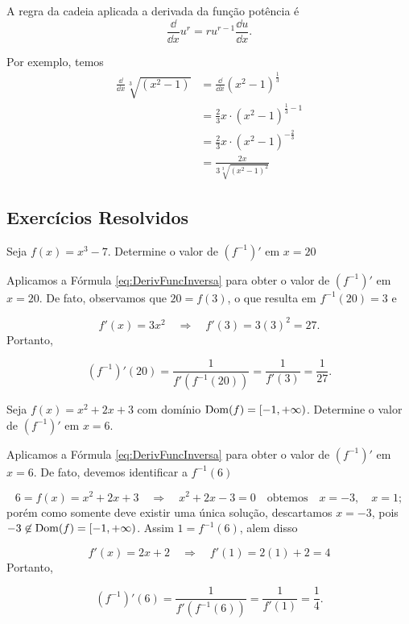 \cleardoublepage\documentclass[../main.tex]{subfiles}
\begin{document}
\begin{ex}
  A regra da cadeia aplicada a derivada da função potência é
  \begin{equation*}
    \frac{\dd}{\dd x}u^r = ru^{r-1}\frac{\dd u}{\dd x}.
  \end{equation*}
  
  Por exemplo, temos
  \begin{align*}
    \frac{\dd}{\dd x}\sqrt[3]{(x^2-1)} &= \frac{\dd}{\dd x}(x^2-1)^{\frac{1}{3}} \\
                                       &= \frac{2}{3}x\cdot (x^2-1)^{\frac{1}{3}-1} \\
                                       &= \frac{2}{3}x\cdot (x^2-1)^{-\frac{2}{3}} \\
                                       &= \frac{2x}{3\sqrt[3]{(x^2-1)^2}}
  \end{align*}
\end{ex}
\subsection{Exercícios Resolvidos}
\begin{exeresol}
  Seja \(f(x)=x^3-7\). Determine o valor de \((f^{-1})'\) em \(x=20\)\\
  \begin{resol}
    Aplicamos a Fórmula \ref{eq:DerivFuncInversa} para obter o valor de \((f^{-1})'\) em \(x=20\). De fato, observamos que \(20=f(3)\), o que resulta em \(f^{-1}(20)=3\) e

\[ f'(x)=3x^2 \quad \Rightarrow \quad f'(3)=3(3)^2=27. \]
Portanto,

\[ \left(f^{-1}\right)'(20)= \dfrac{1}{f'\left(f^{-1}(20) \right)} = \dfrac{1}{f'(3)} =\dfrac{1}{27}. \]
  \end{resol}
\end{exeresol}
\begin{exeresol}
  Seja \(f(x)=x^2+2x+3\) com domínio \({\rm Dom}(f)=[-1,+\infty)\). Determine o valor de \((f^{-1})'\) em \(x=6\).\\
  \begin{resol}
    Aplicamos a Fórmula \ref{eq:DerivFuncInversa}  para obter o valor de \((f^{-1})'\) em \(x=6\). De fato, devemos identificar a \(f^{-1}(6)\)

\[ 6=f(x)=x^2+2x+3 \quad \Rightarrow \quad x^2+2x-3=0 \quad \mbox{obtemos} \quad x=-3,\quad x=1; \]
porém como somente deve existir uma única solução, descartamos \(x=-3\), pois \(-3\not\in{\rm Dom}(f)=[-1,+\infty)\). Assim \(1=f^{-1}(6)\), alem disso

\[ f'(x)=2x+2 \quad \Rightarrow \quad f'(1)=2(1)+2=4 \]
Portanto,

\[ \left(f^{-1}\right)'(6)= \dfrac{1}{f'\left(f^{-1}(6) \right)} = \dfrac{1}{f'(1)} =\dfrac{1}{4}. \]
  \end{resol}
\end{exeresol}
\end{document}
